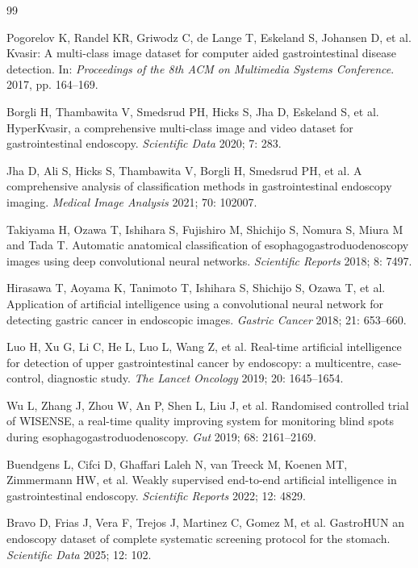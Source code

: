 \documentclass[Afour,sagev,times]{sagej}
\begin{document}
\begin{thebibliography}{99}

Pogorelov K, Randel KR, Griwodz C, de Lange T, Eskeland S, Johansen D, et al. Kvasir: A multi-class image dataset for computer aided gastrointestinal disease detection. In: \textit{Proceedings of the 8th ACM on Multimedia Systems Conference}. 2017, pp. 164--169.

Borgli H, Thambawita V, Smedsrud PH, Hicks S, Jha D, Eskeland S, et al. HyperKvasir, a comprehensive multi-class image and video dataset for gastrointestinal endoscopy. \textit{Scientific Data} 2020; 7: 283.

Jha D, Ali S, Hicks S, Thambawita V, Borgli H, Smedsrud PH, et al. A comprehensive analysis of classification methods in gastrointestinal endoscopy imaging. \textit{Medical Image Analysis} 2021; 70: 102007.

Takiyama H, Ozawa T, Ishihara S, Fujishiro M, Shichijo S, Nomura S, Miura M and Tada T. Automatic anatomical classification of esophagogastroduodenoscopy images using deep convolutional neural networks. \textit{Scientific Reports} 2018; 8: 7497.

Hirasawa T, Aoyama K, Tanimoto T, Ishihara S, Shichijo S, Ozawa T, et al. Application of artificial intelligence using a convolutional neural network for detecting gastric cancer in endoscopic images. \textit{Gastric Cancer} 2018; 21: 653--660.

Luo H, Xu G, Li C, He L, Luo L, Wang Z, et al. Real-time artificial intelligence for detection of upper gastrointestinal cancer by endoscopy: a multicentre, case-control, diagnostic study. \textit{The Lancet Oncology} 2019; 20: 1645--1654.

Wu L, Zhang J, Zhou W, An P, Shen L, Liu J, et al. Randomised controlled trial of WISENSE, a real-time quality improving system for monitoring blind spots during esophagogastroduodenoscopy. \textit{Gut} 2019; 68: 2161--2169.

Buendgens L, Cifci D, Ghaffari Laleh N, van Treeck M, Koenen MT, Zimmermann HW, et al. Weakly supervised end-to-end artificial intelligence in gastrointestinal endoscopy. \textit{Scientific Reports} 2022; 12: 4829.

Bravo D, Frias J, Vera F, Trejos J, Martinez C, Gomez M, et al. GastroHUN an endoscopy dataset of complete systematic screening protocol for the stomach. \textit{Scientific Data} 2025; 12: 102.


\end{thebibliography}
\end{document}
